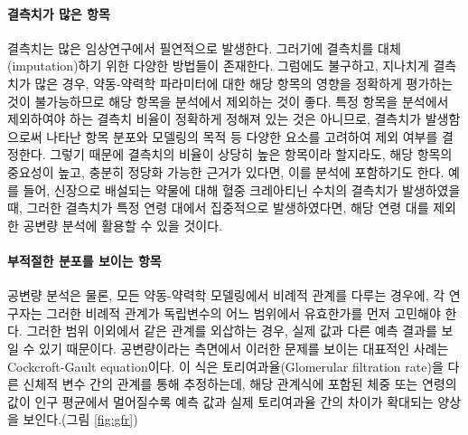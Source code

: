 \documentclass[
  10pt,
  krantz2,
  a4paper]{krantz}
\theoremstyle{definition}
\theoremstyle{definition}
\theoremstyle{definition}
\theoremstyle{remark}
\begin{document}
\hypertarget{uxacb0uxce21uxce58uxac00-uxb9ceuxc740-uxd56duxbaa9}{%
\paragraph{결측치가 많은 항목}\label{uxacb0uxce21uxce58uxac00-uxb9ceuxc740-uxd56duxbaa9}}

결측치는 많은 임상연구에서 필연적으로 발생한다. 그러기에 결측치를 대체(imputation)하기 위한 다양한 방법들이 존재한다. 그럼에도 불구하고, 지나치게 결측치가 많은 경우, 약동-약력학 파라미터에 대한 해당 항목의 영향을 정확하게 평가하는 것이 불가능하므로 해당 항목을 분석에서 제외하는 것이 좋다. 특정 항목을 분석에서 제외하여야 하는 결측치 비율이 정확하게 정해져 있는 것은 아니므로, 결측치가 발생함으로써 나타난 항목 분포와 모델링의 목적 등 다양한 요소를 고려하여 제외 여부를 결정한다. 그렇기 때문에 결측치의 비율이 상당히 높은 항목이라 할지라도, 해당 항목의 중요성이 높고, 충분히 정당화 가능한 근거가 있다면, 이를 분석에 포함하기도 한다. 예를 들어, 신장으로 배설되는 약물에 대해 혈중 크레아티닌 수치의 결측치가 발생하였을 때, 그러한 결측치가 특정 연령 대에서 집중적으로 발생하였다면, 해당 연령 대를 제외한 공변량 분석에 활용할 수 있을 것이다.

\hypertarget{improper}{%
\paragraph{부적절한 분포를 보이는 항목}\label{improper}}

공변량 분석은 물론, 모든 약동-약력학 모델링에서 비례적 관계를 다루는 경우에, 각 연구자는 그러한 비례적 관계가 독립변수의 어느 범위에서 유효한가를 먼저 고민해야 한다. 그러한 범위 이외에서 같은 관계를 외삽하는 경우, 실제 값과 다른 예측 결과를 보일 수 있기 때문이다. 공변량이라는 측면에서 이러한 문제를 보이는 대표적인 사례는 Cockcroft-Gault equation이다. 이 식은 토리여과율(Glomerular filtration rate)을 다른 신체적 변수 간의 관계를 통해 추정하는데, 해당 관계식에 포함된 체중 또는 연령의 값이 인구 평균에서 멀어질수록 예측 값과 실제 토리여과율 간의 차이가 확대되는 양상을 보인다.(그림 \ref{fig:gfr}) 
\end{document}

